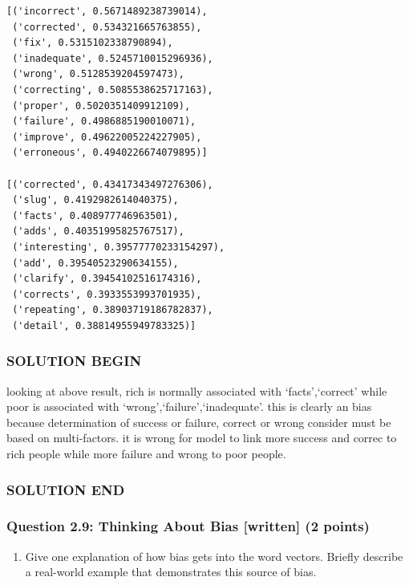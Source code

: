 \documentclass[11pt]{article}
\providecommand{\tightlist}{%
      \setlength{\itemsep}{0pt}\setlength{\parskip}{0pt}}
\begin{document}
    \begin{Verbatim}[commandchars=\\\{\}]
[('incorrect', 0.5671489238739014),
 ('corrected', 0.534321665763855),
 ('fix', 0.5315102338790894),
 ('inadequate', 0.5245710015296936),
 ('wrong', 0.5128539204597473),
 ('correcting', 0.5085538625717163),
 ('proper', 0.5020351409912109),
 ('failure', 0.4986885190010071),
 ('improve', 0.49622005224227905),
 ('erroneous', 0.4940226674079895)]

[('corrected', 0.43417343497276306),
 ('slug', 0.4192982614040375),
 ('facts', 0.408977746963501),
 ('adds', 0.40351995825767517),
 ('interesting', 0.39577770233154297),
 ('add', 0.39540523290634155),
 ('clarify', 0.39454102516174316),
 ('corrects', 0.3933553993701935),
 ('repeating', 0.38903719186782837),
 ('detail', 0.38814955949783325)]
    \end{Verbatim}

    \subsubsection{SOLUTION BEGIN}\label{solution-begin}

looking at above result, rich is normally associated with
`facts',`correct' while poor is associated with
`wrong',`failure',`inadequate'. this is clearly an bias because
determination of success or failure, correct or wrong consider must be
based on multi-factors. it is wrong for model to link more success and
correc to rich people while more failure and wrong to poor people.

\subsubsection{SOLUTION END}\label{solution-end}

    \subsubsection{Question 2.9: Thinking About Bias {[}written{]} (2
points)}\label{question-2.9-thinking-about-bias-written-2-points}

\begin{enumerate}
\def\labelenumi{\alph{enumi}.}
\tightlist
\item
  Give one explanation of how bias gets into the word vectors. Briefly
  describe a real-world example that demonstrates this source of bias.
\end{enumerate}
\end{document}
